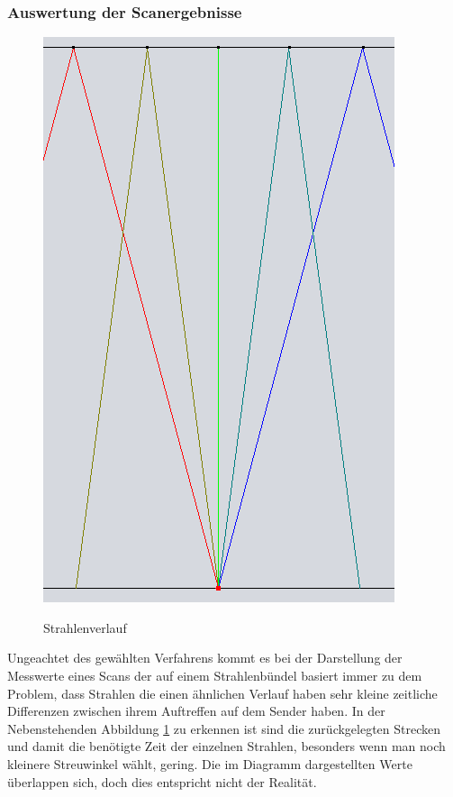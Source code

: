 \documentclass[reducespace,stylepage,semiarbeit]{spezidoc}
\begin{document}
\newpage
\subsubsection{Auswertung der Scanergebnisse}
\begin{figure}
\includegraphics[scale=0.25]{pictures/Strahlenbuendel.png} 
\label{fig:Wegunterschied}
\caption{Strahlenverlauf}
\end{figure} 
Ungeachtet des gewählten Verfahrens kommt es bei der Darstellung der Messwerte eines Scans der auf einem Strahlenbündel basiert immer zu dem Problem, dass Strahlen die einen ähnlichen Verlauf haben sehr kleine zeitliche Differenzen zwischen ihrem Auftreffen auf dem Sender haben. 
In der Nebenstehenden Abbildung \ref{fig:Wegunterschied} zu erkennen ist sind die zurückgelegten Strecken und damit die benötigte Zeit der einzelnen Strahlen, besonders wenn man noch kleinere Streuwinkel wählt, gering. %
Die im Diagramm dargestellten Werte überlappen sich, doch dies entspricht nicht der Realität. 
\end{document}
